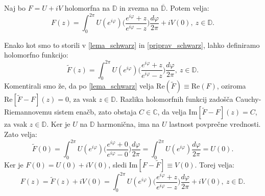 \documentclass[mat1]{fmfdelo}
\begin{document}
    \begin{posledica}
        Naj bo $F = U + iV$ holomorfna na $\mathbb{D}$ in zvezna na $\overline{\mathbb{D}}$. Potem velja: 
        $$ 
            F(z) = \int_{0}^{2 \pi}{U(e^{i \varphi})\bigg(\frac{e^{i\varphi}+z}{e^{i\varphi}-z}\bigg)\frac{d \varphi}{2 \pi}} + i V(0),~z \in \mathbb{D}.
        $$
    \end{posledica}
    \begin{dokaz}
        Enako kot smo to storili v \eqref{lema_schwarz} in \eqref{priprav_schwarz}, lahko definiramo holomorfno funkcijo:
        $$
        \widetilde{F}(z) = \int_{0}^{2 \pi}{U(e^{i \varphi})\bigg(\frac{e^{i\varphi}+z}{e^{i\varphi}-z}\bigg)\frac{d \varphi}{2 \pi}},~z \in \mathbb{D}.
        $$
        Komentirali smo že, da po \eqref{lema_schwarz} velja $\text{Re}(\widetilde{F}) \equiv \text{Re}(F)$, oziroma $\text{Re}[\widetilde{F} - F](z) = 0$, za vsak $z \in \mathbb{D}$. Razlika holomorfnih funkcij zadošča Cauchy-Riemannovemu sistem enačb, zato obstaja $C \in \mathbb{C}$, da velja $\text{Im}[\widetilde{F} - F](z) = C$, za vsak $z \in \mathbb{D}$.
        Ker je $U$ na $\mathbb{D}$ harmonična, ima na $U$ lastnost povprečne vrednosti. Zato velja:
        $$
        \widetilde{F}(0) = \int_{0}^{2 \pi}{U(e^{i \varphi})\bigg(\frac{e^{i\varphi}+0}{e^{i\varphi}-0}\bigg)\frac{d \varphi}{2 \pi}} = \int_{0}^{2 \pi}{U(e^{i \varphi})\frac{d \varphi}{2 \pi}} = U(0).
        $$
        Ker je $F(0) = U(0) + iV(0)$, sledi $\text{Im}[F - \widetilde{F}] \equiv V(0)$.
        Torej velja:
        $$ 
        F(z) = \widetilde{F}(z) + iV(0) = \int_{0}^{2 \pi}{U(e^{i \varphi})\bigg(\frac{e^{i\varphi}+z}{e^{i\varphi}-z}\bigg)\frac{d \varphi}{2 \pi}} + i V(0),~z \in \mathbb{D}.
        $$
    \end{dokaz}
\end{document}

